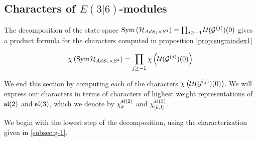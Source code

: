 \documentclass[../main.tex]{subfiles}
\begin{document}
\subsection{Characters of $E(3|6)$-modules}\label{e36char}
The decomposition of the state space $\text{Sym} \left (\mathcal{H}_{AdS_7\times S^4}\right ) = \prod_{j\geq -1} \mathcal{U} (\mathcal{G}^{(j)})(0)$ gives a product formula for the characters computed in proposition \ref{prop:sugraindex1}

\[ \chi \left ( \text{Sym} \mathcal{H}_{AdS_7\times S^4} \right ) = \prod_{j\geq -1} \chi \left (\mathcal{U} (\mathcal{G}^{(j)})(0) \right ) \]

We end this section by computing each of the characters $\chi \left (\mathcal{U} (\mathcal{G}^{(j)})(0) \right )$. We will express our characters in terms of characters of highest weight representations of $\mathfrak{sl}(2)$ and $\mathfrak{sl}(3)$, which we denote by $\chi_k^{\mathfrak{sl}(2)}$ and $\chi^{\mathfrak{sl}(3)}_{[k,l]}$.

\parsec[]
We begin with the lowest step of the decomposition, using the characterization given in \ref{subsec:g-1}. 
\end{document}
